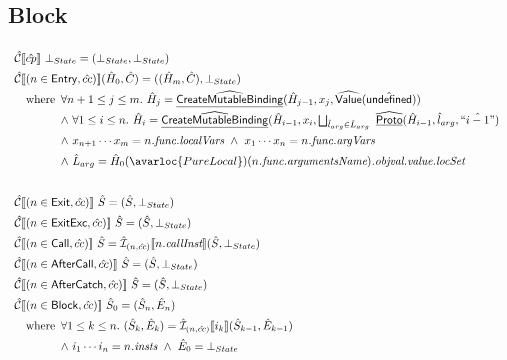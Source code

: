 \subsection{Block}
\[
\renewcommand\arraystretch{1.5}
\begin{array}{l}

\aC \lbr \hat{cp} \rbr\ \bot_{State} = (\bot_{State}, \bot_{State}) \\

\aC \lbr (n \in \SF{Entry}, \hat{cc}) \rbr (\hat{H}_0, \hat{C}) = ((\hat{H}_m, \hat{C}), \bot_{State}) \\
\quad\wherec{
\forall n+1 \leq j \leq m.\ \hat{H}_j = \ahf{CreateMutableBinding}(\hat{H}_{j-1}, x_j, \abs{Value}(\aundef)) \\
\land\ \forall 1 \leq i \leq n.\ \hat{H}_i = \ahf{CreateMutableBinding}(\hat{H}_{i-1}, x_i,
    \bigsqcup_{\hat{l}_{arg} \in \hat{L}_{arg}}\ \ahf{Proto}(\hat{H}_{i-1}, \hat{l}_{arg}, \hat{``i-1"}) \\
\land\ x_{n+1} \cdots x_m = n\emph{.func.localVars} \
\land\ x_1 \cdots x_n = n\emph{.func.argVars} \\
\land\ \hat{L}_{arg} = \hat{H}_0(\avarloc{PureLocal})(n\emph{.func.argumentsName})\emph{.objval.value.locSet}
}\\\\

\aC \lbr (n \in \SF{Exit}, \hat{cc}) \rbr\ \hat{S} = (\hat{S}, \bot_{State}) \\

\aC \lbr (n \in \SF{ExitExc}, \hat{cc}) \rbr\ \hat{S} = (\hat{S}, \bot_{State}) \\

\aC \lbr (n \in \SF{Call}, \hat{cc}) \rbr\ \hat{S} 
= \aI_{(n, \hat{cc})} \lbr n\emph{.callInst} \rbr (\hat{S}, \bot_{State}) \\

\aC \lbr (n \in \SF{AfterCall}, \hat{cc}) \rbr\ \hat{S} = (\hat{S}, \bot_{State}) \\

\aC \lbr (n \in \SF{AfterCatch}, \hat{cc}) \rbr\ \hat{S} = (\hat{S}, \bot_{State}) \\

\aC \lbr (n \in \SF{Block}, \hat{cc}) \rbr\ \hat{S}_0 = (\hat{S}_n, \hat{E}_n) \\
\quad\wherec{
\forall 1 \leq k \leq n.\ 
(\hat{S}_k, \hat{E}_k) = \aI_{(n, \hat{cc})} \lbr i_k \rbr (\hat{S}_{k-1}, \hat{E}_{k-1}) \\
\land\ i_1 \cdots i_n = n\emph{.insts} \
\land\ \hat{E}_0 = \bot_{State}
}\\\\

\end{array}
\]


